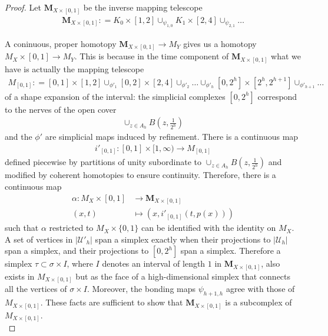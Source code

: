 \documentclass[a4paper,11pt]{article}
\theoremstyle{definition}
\theoremstyle{plain}
\theoremstyle{remark}
\begin{document}
{\begin{proof}
Let $\mathbf{M}_{X \times [0,1]}$ be the inverse mapping telescope  
\begin{align*}
\mathbf{M}_{X \times [0,1]}: = K_{0} \times [1,2]\cup_{\psi_{1,0}} K_{1} \times [2,4]\cup_{\psi_{2,1}}\dots 
\end{align*}

A coninuous, proper homotopy $ \mathbf{M}_{X \times [0,1]} \rightarrow M_{Y}$ gives us a homotopy $M_{X}\times [0,1]\rightarrow M_{Y}$. This is because in the time component of $\mathbf{M}_{X \times [0,1]}$  what we have is actually the mapping telescope
\begin{align*}
M_{[0,1]}: = [0,1] \times [1,2] \cup_{\phi'_{1}} [0,2] \times [2,4] \cup_{\phi'_{2}}\dots \cup_{\phi'_{h}} [0,2^h]\times [2^h,2^{h+1}] \cup_{\phi'_{h+1}} \dots
\end{align*}
of a shape expansion of the interval: the simplicial complexes $[0,2^h]$ correspond to the nerves of the open cover
\begin{align*}
\cup_{z\in A_{h}} B(z,\frac{1}{2^{h}})
\end{align*}
and the $\phi'$ are simplicial maps induced by refinement. There is a continuous map 
\begin{align*}
i'_{[0,1]}: [0,1]\times [1,\infty)\rightarrow M_{[0,1]}
\end{align*}
defined piecewise by partitions of unity subordinate to $\cup_{z\in A_{h}} B(z,\frac{1}{2^{h}})$ and modified by coherent homotopies to ensure continuity. Therefore, there is a continuous map
\begin{align*}
 \alpha: M_{X} \times [0,1] &\rightarrow \mathbf{M}_{X \times [0,1]}\\
(x,t) &\mapsto (x, i'_{[0,1]}(t,p(x)))
\end{align*} such that $\alpha$ restricted to $M_{X} \times \{0,1\}$ can be identified with the identity on $M_{X}$.  \\

 A set of vertices in $|\mathcal{U}'_{h}|$ span a simplex exactly when their projections to $|\mathcal{U}_{h}|$ span a simplex, and their projections to $[0,2^h]$ span a simplex. Therefore a simplex $\tau\subset \sigma \times I$, where $I$ denotes an interval of length $1$ in $\mathbf{M}_{X \times [0,1]}$, also exists in $M_{X\times [0,1]}$ but as the face of a high-dimensional simplex that connects all the vertices of $ \sigma \times I$. Moreover, the bonding maps $\psi_{h+1,h}$ agree with those of $M_{X \times [0,1]}$. These facts are sufficient to show that $\mathbf{M}_{X \times [0,1]}$ is a subcomplex of $M_{X\times [0,1]}$.\\


\end{proof}}
\end{document}
